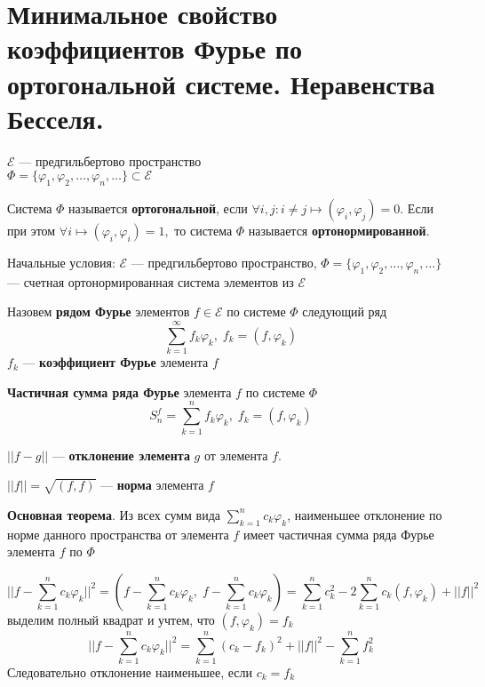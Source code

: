 \section{Минимальное свойство коэффициентов Фурье по ортогональной системе. Неравенства Бесселя.}
$ \mathcal{E} $ --- предгильбертово пространство\\
$ \Phi = \{ \varphi_1, \varphi_2, \ldots, \varphi_n,\ldots \} \subset \mathcal{E}$

\begin{greyDefinition}
	Система $ \Phi $ называется \textbf{ортогональной}, если $ \forall i,j: i\neq j \mapsto (\varphi_i,\varphi_j) =0 $. Если при этом $ \forall i \mapsto (\varphi_i,\varphi_i) =1,  $ то система $ \Phi $ называется \textbf{ортонормированной}. 
\end{greyDefinition}

Начальные условия: $ \mathcal{E} $ --- предгильбертово пространство, $ \Phi = \{ \varphi_1,\varphi_2,\ldots,\varphi_n,\ldots \} $ --- счетная ортонормированная система элементов из $ \mathcal{E} $
\begin{greyDefinition} Назовем \textbf{рядом Фурье} элементов $ f \in \mathcal{E} $ по системе $ \Phi $ следующий ряд
	\[
	\sum_{k=1}^{\infty} f_k\varphi_k,\; f_k = (f,\varphi_k)
	\]
	$ f_k $ --- \textbf{коэффициент Фурье} элемента $ f $
	
	\textbf{Частичная сумма ряда Фурье} элемента $ f $ по системе $ \Phi $
	\[
	S_n^f = \sum_{k=1}^n f_k\varphi_k,\; f_k = (f,\varphi_k)
	\]
	
	$||f-g|| $ --- \textbf{отклонение элемента} $ g $ от элемента $ f $. 
	
	$ ||f||=\sqrt{(f,f)} $ --- \textbf{норма} элемента $ f $
\end{greyDefinition}
\begin{greyTheorem}\textbf{Основная теорема}.	Из всех сумм вида $ \sum_{k=1}^{n} c_k \varphi_k $, наименьшее отклонение по норме данного пространства от элемента $ f $ имеет частичная сумма ряда Фурье элемента $ f $ по $ \Phi $
\end{greyTheorem}
\begin{greyProof}
	\[
	||f-\sum_{k=1}^n c_k\varphi_k ||^2 = (f-\sum_{k=1}^n c_k\varphi_k,\; f -\sum_{k=1}^n c_k\varphi_k ) = \sum_{k=1}^{n}c_k^2 - 2\sum_{k=1}^n c_k(f,\varphi_k) + ||f||^2
	\]
	выделим полный квадрат и учтем, что $ (f,\varphi_k) = f_k$
	\[
	||f-\sum_{k=1}^n c_k\varphi_k ||^2 = \sum_{k=1}^n(c_k-f_k)^2 + ||f||^2 - \sum_{k=1}^n f_k^2 	
	\]
	Следовательно отклонение наименьшее, если $ c_k = f_k $
\end{greyProof}
